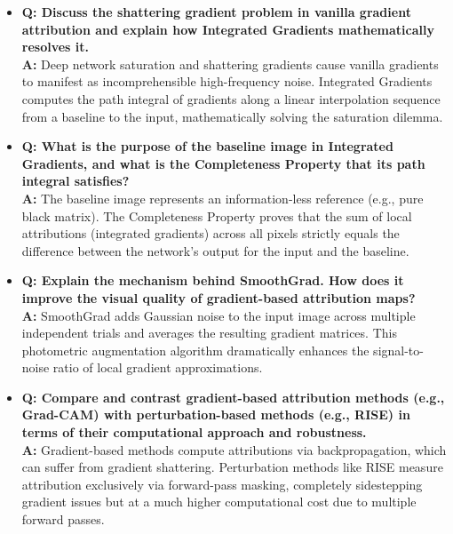 \begin{itemize}
    \item \textbf{Q: Discuss the shattering gradient problem in vanilla gradient attribution and explain how Integrated Gradients mathematically resolves it.} \\
    \textbf{A:} Deep network saturation and shattering gradients cause vanilla gradients to manifest as incomprehensible high-frequency noise. Integrated Gradients computes the path integral of gradients along a linear interpolation sequence from a baseline to the input, mathematically solving the saturation dilemma.
    \item \textbf{Q: What is the purpose of the baseline image in Integrated Gradients, and what is the Completeness Property that its path integral satisfies?} \\
    \textbf{A:} The baseline image represents an information-less reference (e.g., pure black matrix). The Completeness Property proves that the sum of local attributions (integrated gradients) across all pixels strictly equals the difference between the network's output for the input and the baseline.
    \item \textbf{Q: Explain the mechanism behind SmoothGrad. How does it improve the visual quality of gradient-based attribution maps?} \\
    \textbf{A:} SmoothGrad adds Gaussian noise to the input image across multiple independent trials and averages the resulting gradient matrices. This photometric augmentation algorithm dramatically enhances the signal-to-noise ratio of local gradient approximations.
    \item \textbf{Q: Compare and contrast gradient-based attribution methods (e.g., Grad-CAM) with perturbation-based methods (e.g., RISE) in terms of their computational approach and robustness.} \\
    \textbf{A:} Gradient-based methods compute attributions via backpropagation, which can suffer from gradient shattering. Perturbation methods like RISE measure attribution exclusively via forward-pass masking, completely sidestepping gradient issues but at a much higher computational cost due to multiple forward passes.
\end{itemize}
